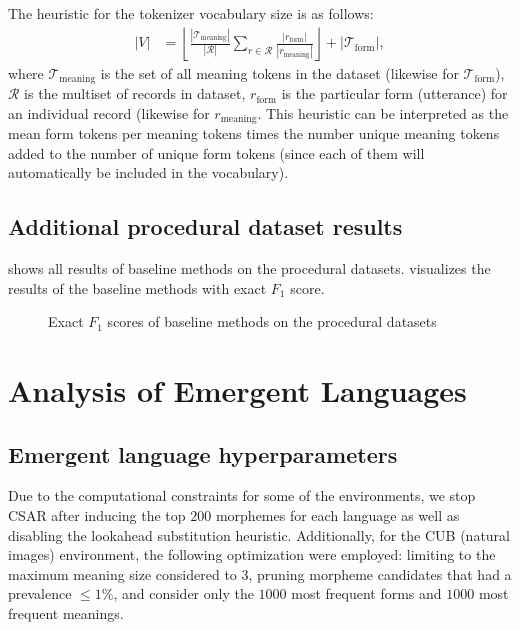 The heuristic for the tokenizer vocabulary size is as follows:
\begin{align}
  |V| &= \left\lfloor
    \frac{|\mathcal T_\text{meaning}|}{|\mathcal R|} \sum_{r\in\mathcal R} \frac{|r_\text{form}|}{|r_\text{meaning}|}
  \right\rfloor
    + |\mathcal T_\text{form}|
  ,
\end{align}
where
  $\mathcal T_\text{meaning}$ is the set of all meaning tokens in the dataset (likewise for $\mathcal T_\text{form}$),
  $\mathcal R$ is the multiset of records in dataset,
  $r_\text{form}$ is the particular form (utterance) for an individual record (likewise for $r_\text{meaning}$.
This heuristic can be interpreted as the mean form tokens per meaning tokens times the number unique meaning tokens added to the number of unique form tokens (since each of them will automatically be included in the vocabulary).

\subsection{Additional procedural dataset results}%
\label{app:proc-table}

 shows all results of baseline methods on the procedural datasets.
 visualizes the results of the baseline methods with exact $F_1$ score.

\begin{table}
\centering
\small

\caption{Results of baseline methods on the procedural datasets.}%
\label{tab:proc-all}
\end{table}

\begin{figure}
\centering

\caption{Exact $F_1$ scores of baseline methods on the procedural datasets}%
\label{fig:baseline-exact}
\end{figure}

\section{Analysis of Emergent Languages}

\subsection{Emergent language hyperparameters}%
\label{app:el-hparams}

Due to the computational constraints for some of the environments, we stop CSAR after inducing the top $200$ morphemes for each language as well as disabling the lookahead substitution heuristic.
Additionally, for the CUB (natural images) environment, the following optimization were employed:
  limiting to the maximum meaning size considered to $3$,
  pruning morpheme candidates that had a prevalence ${\le}1\%$,
  and consider only the $1000$ most frequent forms and $1000$ most frequent meanings.

